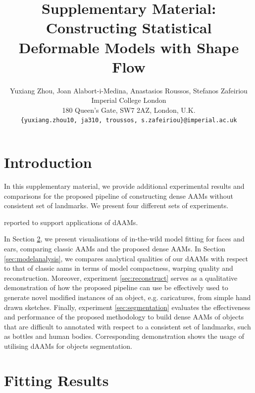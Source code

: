 






\title{Supplementary Material: Constructing Statistical Deformable Models with Shape Flow}

\author{Yuxiang Zhou, Joan Alabort-i-Medina, Anastasios Roussos, Stefanos Zafeiriou\\
Imperial College London\\
180 Queen’s Gate, SW7 2AZ, London, U.K.\\
{\tt\small \{yuxiang.zhou10, ja310, troussos, s.zafeiriou\}@imperial.ac.uk}}
\maketitle
\thispagestyle{empty}


\appendix
\section{Introduction}
In this supplementary material, we provide additional experimental results and comparisons for the proposed pipeline of constructing dense AAMs without consistent set of landmarks. 
We present four different sets of experiments. 

reported to support applications of dAAMs. 

In Section \ref{sec:fittingresults}, we present visualisations of in-the-wild model fitting  for faces and ears, comparing classic AAMs and the proposed dense AAMs. In Section \ref{sec:modelanalysis}, we compares analytical qualities of our dAAMs with respect to that of classic aams in terms of model compactness, warping quality and reconstruction.
Moreover, experiment \ref{sec:reconstruct} serves as a qualitative demonstration of how the proposed pipeline can use be effectively used to generate novel modified instances of an object, e.g. caricatures, from simple hand drawn sketches.
Finally, experiment \ref{sec:segmentation} evaluates the effectiveness and performance of the proposed methodology to build dense AAMs of objects that are difficult to annotated with respect to a consistent set of landmarks, such as bottles and human bodies. Corresponding demonstration shows the usage of utilising dAAMs for objects segmentation.

\section{Fitting Results}
\label{sec:fittingresults}

